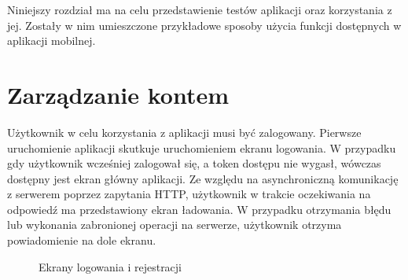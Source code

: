 
Niniejszy rozdział ma na celu przedstawienie testów aplikacji oraz korzystania z jej. Zostały w nim umieszczone przykładowe sposoby użycia funkcji dostępnych w aplikacji mobilnej.



\section{Zarządzanie kontem}{
	


Użytkownik w celu korzystania z aplikacji musi być zalogowany. Pierwsze uruchomienie aplikacji skutkuje uruchomieniem ekranu logowania. W przypadku gdy użytkownik wcześniej zalogował się, a token dostępu nie wygasł, wówczas dostępny jest ekran główny aplikacji. Ze względu na asynchroniczną komunikację z serwerem poprzez zapytania HTTP, użytkownik w trakcie oczekiwania na odpowiedź ma przedstawiony ekran ładowania. W przypadku otrzymania błędu lub wykonania zabronionej operacji na serwerze, użytkownik otrzyma powiadomienie na dole ekranu.

\begin{figure}[h]
	\centering
	\quad
	\caption{Ekrany logowania i rejestracji}
	\label{fig:registerpage}
\end{figure}

}
